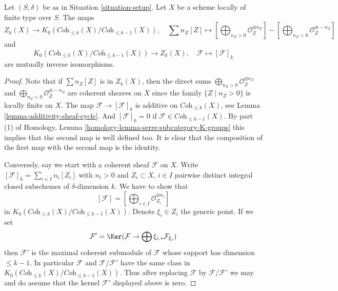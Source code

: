 \begin{lemma}
\label{lemma-cycles-k-group}
Let $(S, \delta)$ be as in Situation \ref{situation-setup}.
Let $X$ be a scheme locally of finite type over $S$.
The maps
$$
Z_k(X)
\longrightarrow
K_0(\textit{Coh}_{\leq k}(X)/\textit{Coh}_{\leq k - 1}(X)),
\quad
\sum n_Z[Z] \mapsto
\left[\bigoplus\nolimits_{n_Z > 0} \mathcal{O}_Z^{\oplus n_Z}\right]
-
\left[\bigoplus\nolimits_{n_Z < 0} \mathcal{O}_Z^{\oplus -n_Z}\right]
$$
and
$$
K_0(\textit{Coh}_{\leq k}(X)/\textit{Coh}_{\leq k - 1}(X))
\longrightarrow
Z_k(X),\quad
\mathcal{F} \longmapsto [\mathcal{F}]_k
$$
are mutually inverse isomorphisms.
\end{lemma}

\begin{proof}
Note that if $\sum n_Z[Z]$ is in $Z_k(X)$, then
the direct sums
$\bigoplus\nolimits_{n_Z > 0} \mathcal{O}_Z^{\oplus n_Z}$ and
$\bigoplus\nolimits_{n_Z < 0} \mathcal{O}_Z^{\oplus -n_Z}$
are coherent sheaves on $X$ since the family $\{Z \mid n_Z > 0\}$
is locally finite on $X$.
The map $\mathcal{F} \to [\mathcal{F}]_k$ is additive
on $\textit{Coh}_{\leq k}(X)$, see
Lemma \ref{lemma-additivity-sheaf-cycle}. And $[\mathcal{F}]_k = 0$
if $\mathcal{F} \in \textit{Coh}_{\leq k - 1}(X)$. By part (1)
of Homology, Lemma \ref{homology-lemma-serre-subcategory-K-groups}
this implies that the second map is well defined too.
It is clear that the composition of the first map with the second
map is the identity.

\medskip\noindent
Conversely, say we start with a coherent sheaf $\mathcal{F}$
on $X$. Write $[\mathcal{F}]_k = \sum_{i \in I} n_i[Z_i]$
with $n_i > 0$ and $Z_i \subset X$, $i \in I$
pairwise distinct integral closed subschemes of $\delta$-dimension $k$.
We have to show that
$$
[\mathcal{F}] = [\bigoplus\nolimits_{i \in I} \mathcal{O}_{Z_i}^{\oplus n_i}]
$$
in $K_0(\textit{Coh}_{\leq k}(X)/\textit{Coh}_{\leq k - 1}(X))$.
Denote $\xi_i \in Z_i$ the generic point.
If we set
$$
\mathcal{F}' = \Ker(\mathcal{F} \to \bigoplus \xi_{i, *}\mathcal{F}_{\xi_i})
$$
then $\mathcal{F}'$ is the maximal coherent submodule of $\mathcal{F}$
whose support has dimension $\leq k - 1$. In particular $\mathcal{F}$
and $\mathcal{F}/\mathcal{F}'$ have the same class in
$K_0(\textit{Coh}_{\leq k}(X)/\textit{Coh}_{\leq k - 1}(X))$.
Thus after replacing $\mathcal{F}$ by $\mathcal{F}/\mathcal{F}'$
we may and do assume that the kernel $\mathcal{F}'$ displayed
above is zero.


\end{proof}
